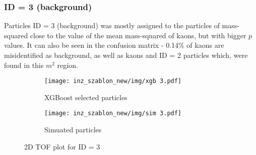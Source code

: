 \subsubsection{ID = 3 (background)}
Particles ID = 3 (background) was mostly assigned to the particles of mass-squared close to the value of the mean mass-squared of kaons, but with bigger $p$ values. It can also be seen in the confusion matrix - 0.14\% of kaons are misidentified as background, as well as kaons and ID = 2 particles which, were found in this $m^2$ region.
\begin{figure}[H]
 \centering
    \begin{subfigure}[b]{0.7\linewidth} 
        \centering
        \texttt{[image: inz\_szablon\_new/img/xgb 3.pdf]}
        \caption{XGBoost selected particles}
        \vspace{0.3cm}
    \end{subfigure}
     \hfill
       \begin{subfigure}[b]{0.7\linewidth}
        \centering
        \texttt{[image: inz\_szablon\_new/img/sim 3.pdf]}
        \caption{Simuated particles}
        \vspace{0.3cm}
    \end{subfigure}
    \caption{2D TOF plot for ID = 3}
\end{figure}
\clearpage